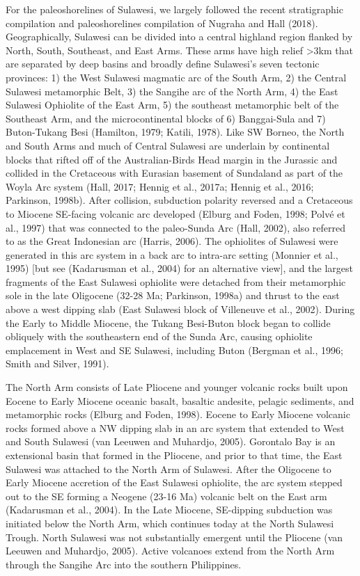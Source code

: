 \documentclass[11pt,letterpaper]{article}
\begin{document}
For the paleoshorelines of Sulawesi, we largely followed the recent stratigraphic compilation and paleoshorelines compilation of Nugraha and Hall (2018). Geographically, Sulawesi can be divided into a central highland region flanked by North, South, Southeast, and East Arms. These arms have high relief >3km that are separated by deep basins and broadly define Sulawesi’s seven tectonic provinces: 1) the West Sulawesi magmatic arc of the South Arm, 2) the Central Sulawesi metamorphic Belt, 3) the Sangihe arc of the North Arm, 4) the East Sulawesi Ophiolite of the East Arm, 5) the southeast metamorphic belt of the Southeast Arm, and the microcontinental blocks of 6) Banggai-Sula and 7) Buton-Tukang Besi (Hamilton, 1979; Katili, 1978). Like SW Borneo, the North and South Arms and much of Central Sulawesi are underlain by continental blocks that rifted off of the Australian-Birds Head margin in the Jurassic and collided in the Cretaceous with Eurasian basement of Sundaland as part of the Woyla Arc system (Hall, 2017; Hennig et al., 2017a; Hennig et al., 2016; Parkinson, 1998b). After collision, subduction polarity reversed and a Cretaceous to Miocene SE-facing volcanic arc developed (Elburg and Foden, 1998; Polvé et al., 1997) that was connected to the paleo-Sunda Arc (Hall, 2002), also referred to as the Great Indonesian arc (Harris, 2006).  The ophiolites of Sulawesi were generated in this arc system in a back arc to intra-arc setting (Monnier et al., 1995) [but see (Kadarusman et al., 2004) for an alternative view], and the largest fragments of the East Sulawesi ophiolite were detached from their metamorphic sole in the late Oligocene (32-28 Ma; Parkinson, 1998a) and thrust to the east above a west dipping slab (East Sulawesi block of Villeneuve et al., 2002). During the Early to Middle Miocene, the Tukang Besi-Buton block began to collide obliquely with the southeastern end of the Sunda Arc, causing ophiolite emplacement in West and SE Sulawesi, including Buton (Bergman et al., 1996; Smith and Silver, 1991). 

The North Arm consists of Late Pliocene and younger volcanic rocks built upon Eocene to Early Miocene oceanic basalt, basaltic andesite, pelagic sediments, and metamorphic rocks (Elburg and Foden, 1998). Eocene to Early Miocene volcanic rocks formed above a NW dipping slab in an arc system that extended to West and South Sulawesi (van Leeuwen and Muhardjo, 2005). Gorontalo Bay is an extensional basin that formed in the Pliocene, and prior to that time, the East Sulawesi was attached to the North Arm of Sulawesi. After the Oligocene to Early Miocene accretion of the East Sulawesi ophiolite, the arc system stepped out to the SE forming a Neogene (23-16 Ma) volcanic belt on the East arm (Kadarusman et al., 2004).  In the Late Miocene, SE-dipping subduction was initiated below the North Arm, which continues today at the North Sulawesi Trough. North Sulawesi was not substantially emergent until the Pliocene (van Leeuwen and Muhardjo, 2005). Active volcanoes extend from the North Arm through the Sangihe Arc into the southern Philippines. 
\end{document}
